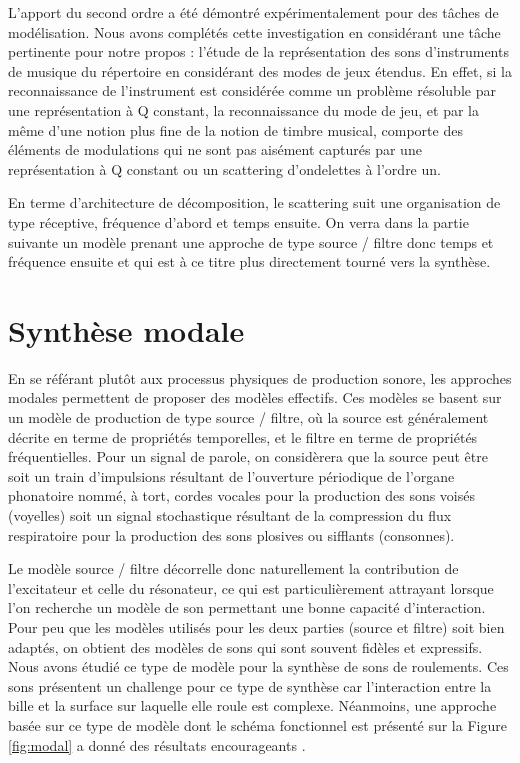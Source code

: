 L'apport du second ordre a été démontré expérimentalement pour des tâches de modélisation\cite{anden2014deep}. Nous avons complétés cette investigation en considérant une tâche pertinente pour notre propos : l'étude de la représentation des sons d'instruments de musique du répertoire en considérant des modes de jeux étendus. En effet, si la reconnaissance de l'instrument est considérée comme un problème résoluble par une représentation à Q constant, la reconnaissance du mode de jeu, et par la même d'une notion plus fine de la notion de timbre musical, comporte des éléments de modulations qui ne sont pas aisément capturés par une représentation à Q constant ou un scattering d'ondelettes à l'ordre un\cite{lostanlen2018extended}.

En terme d'architecture de décomposition, le scattering suit une organisation de type réceptive, fréquence d'abord et temps ensuite. On verra dans la partie suivante un modèle prenant une approche de type source / filtre donc temps et fréquence ensuite et qui est à ce titre plus directement tourné vers la synthèse.

\section{ \nmu Synthèse modale}

En se référant plutôt aux processus physiques de production sonore, les approches modales permettent de proposer des modèles effectifs. Ces modèles se basent sur un modèle de production de type source / filtre, où la source est généralement décrite en terme de propriétés temporelles, et le filtre en terme de propriétés fréquentielles. Pour un signal de parole, on considèrera que la source peut être soit un train d'impulsions résultant de l'ouverture périodique de l'organe phonatoire nommé, à tort,  cordes vocales pour la production des sons voisés (voyelles) soit un signal stochastique résultant de la compression du flux respiratoire pour la production des sons plosives ou sifflants (consonnes).

Le modèle source / filtre décorrelle donc naturellement la contribution de l'excitateur et celle du résonateur, ce qui est particulièrement attrayant lorsque l'on recherche un modèle de son permettant une bonne capacité d'interaction. Pour peu que les modèles utilisés pour les deux parties (source et filtre) soit bien adaptés, on obtient des modèles de sons qui sont souvent fidèles et expressifs\cite{aramaki2006analysis}. Nous avons étudié ce type de modèle pour la synthèse de sons de roulements. Ces sons présentent un challenge pour ce type de synthèse car l'interaction entre la bille et la surface sur laquelle elle roule est complexe. Néanmoins, une approche basée sur ce type de modèle\cite{LagrangeTasslp10} dont le schéma fonctionnel est présenté sur la Figure \ref{fig:modal}  a donné des résultats encourageants
\cite{Murphy11a}.

